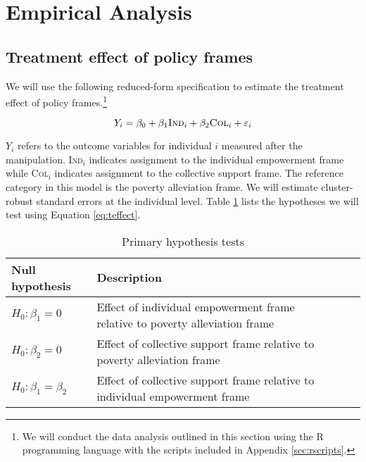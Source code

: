 \documentclass[11pt, a4paper]{article}\usepackage[]{graphicx}\usepackage[]{color}
\begin{document}
\section{Empirical Analysis}

    \subsection{Treatment effect of policy frames}

        We will use the following reduced-form specification to estimate the treatment effect of policy frames.\footnote{We will conduct the data analysis outlined in this section using the R programming language with the scripts included in Appendix \ref{sec:rscripts}.}

  		\begin{equation} \label{eq:teffect}
            Y_{i} = \beta_{0} + \beta_{1}\text{\textsc{Ind}}_{i} + \beta_{2}\text{\textsc{Col}}_{i} + \varepsilon_{i}
		\end{equation}

        $Y_{i}$ refers to the outcome variables for individual $i$ measured after the manipulation. \textsc{Ind}$_{i}$ indicates assignment to the individual empowerment frame while \textsc{Col}$_{i}$ indicates assignment to the collective support frame. The reference category in this model is the poverty alleviation frame. We will estimate cluster-robust standard errors at the individual level. Table \ref{tab:hypotheses} lists the hypotheses we will test using Equation \ref{eq:teffect}.

        \begin{table}[h]
        \centering
        \caption{Primary hypothesis tests}
        \label{tab:hypotheses}
        \begin{tabular}{@{}lllll@{}}
        \toprule
        Null hypothesis                                     & Description                                          &  &  &  \\ \midrule
        $H_0: \beta_1 = 0$ & Effect of individual empowerment frame relative to poverty alleviation frame &  &  &  \\
        $H_0: \beta_2 = 0$ & Effect of collective support frame relative to poverty alleviation frame &  &  &  \\
        $H_0: \beta_1 = \beta_2$ & Effect of collective support frame relative to individual empowerment frame &  &  &  \\ \bottomrule
        \end{tabular}
        \end{table}
\end{document}

